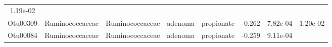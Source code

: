 \documentclass[11pt,]{article}
\begin{document}
\begin{longtable}[]{@{}cccccccc@{}}
\begin{minipage}[t]{0.08\columnwidth}
1.19e-02\strut
\end{minipage}\tabularnewline
\begin{minipage}[t]{0.08\columnwidth}\centering\strut
Otu00309\strut
\end{minipage} & \begin{minipage}[t]{0.15\columnwidth}\centering\strut
Ruminococcaceae\strut
\end{minipage} & \begin{minipage}[t]{0.15\columnwidth}\centering\strut
Ruminococcaceae\strut
\end{minipage} & \begin{minipage}[t]{0.08\columnwidth}\centering\strut
adenoma\strut
\end{minipage} & \begin{minipage}[t]{0.09\columnwidth}\centering\strut
propionate\strut
\end{minipage} & \begin{minipage}[t]{0.07\columnwidth}\centering\strut
-0.262\strut
\end{minipage} & \begin{minipage}[t]{0.08\columnwidth}\centering\strut
7.82e-04\strut
\end{minipage} & \begin{minipage}[t]{0.08\columnwidth}\centering\strut
1.20e-02\strut
\end{minipage}\tabularnewline
\begin{minipage}[t]{0.08\columnwidth}\centering\strut
Otu00084\strut
\end{minipage} & \begin{minipage}[t]{0.15\columnwidth}\centering\strut
Ruminococcaceae\strut
\end{minipage} & \begin{minipage}[t]{0.15\columnwidth}\centering\strut
Ruminococcaceae\strut
\end{minipage} & \begin{minipage}[t]{0.08\columnwidth}\centering\strut
adenoma\strut
\end{minipage} & \begin{minipage}[t]{0.09\columnwidth}\centering\strut
propionate\strut
\end{minipage} & \begin{minipage}[t]{0.07\columnwidth}\centering\strut
-0.259\strut
\end{minipage} & \begin{minipage}[t]{0.08\columnwidth}\centering\strut
9.11e-04\strut
\end{minipage} & \begin{minipage}[t]{0.08\columnwidth}\centering\strut

\end{minipage}
\end{longtable}
\end{document}
